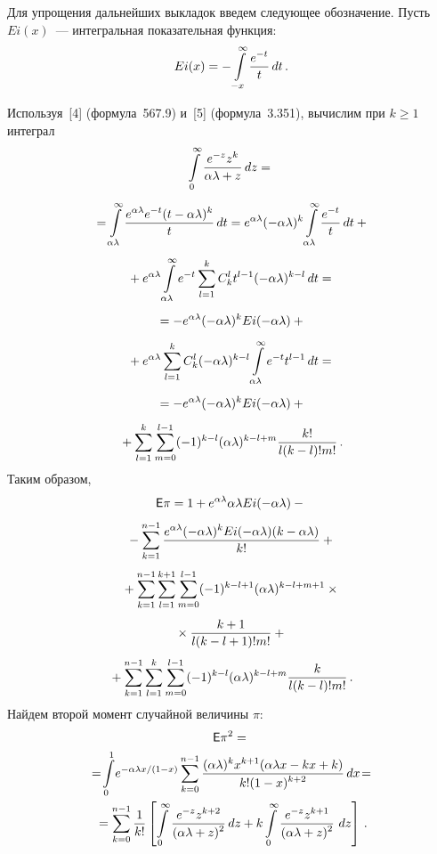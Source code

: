 \begin{multicols}{2}
Для упрощения дальнейших выкладок введем следующее обозначение. Пусть $Ei(x)$~--- интегральная показательная функция:
$$
Ei(x)=-\int\limits_{-x}^{\infty}\displaystyle\frac{\displaystyle e^{-t}\mathstrut}{\displaystyle t\mathstrut}\,dt\,.
$$

Используя~[4] (формула~567.9) и~[5] (формула~3.351), вычислим при $k\ge1$ интеграл
\begin{multline*}
\int\limits_{0}^{\infty}\displaystyle\frac{\displaystyle e^{-z}z^k\mathstrut}{\displaystyle \alpha\lambda+z\mathstrut}\,dz={}\\[5pt]
{}=\int\limits_{\alpha\lambda}^{\infty}\displaystyle\frac{\displaystyle e^{\alpha\lambda}e^{-t}(t-\alpha\lambda)^k\mathstrut}{\displaystyle t\mathstrut}\,dt=
e^{\alpha\lambda}(-\alpha\lambda)^k\int\limits_{\alpha\lambda}^{\infty}\displaystyle\frac{\displaystyle e^{-t}\mathstrut}{\displaystyle t\mathstrut}\,dt+{}\\[5pt]
{}+e^{\alpha\lambda}\int\limits_{\alpha\lambda}^{\infty}e^{-t}\sum_{l=1}^k C_k^l t^{l-1}(-\alpha\lambda)^{k-l}\, dt={}\\[5pt]
{}=-e^{\alpha\lambda}(-\alpha\lambda)^k Ei(-\alpha\lambda)+{}\\[5pt]
{}+e^{\alpha\lambda}\sum_{l=1}^k
C_k^l(-\alpha\lambda)^{k-l}\int\limits_{\alpha\lambda}^{\infty}e^{-t}t^{l-1}\,dt={}\\[5pt]
{}=-e^{\alpha\lambda}(-\alpha\lambda)^k
Ei(-\alpha\lambda)+{}\\[5pt]
{}+\sum_{l=1}^k\sum_{m=0}^{l-1}(-1)^{k-l}(\alpha\lambda)^{k-l+m}\displaystyle\frac{\displaystyle k!\mathstrut}{\displaystyle l(k-l)!m!\mathstrut}\,.
\end{multline*}
%
Таким образом,
{\begin{multline*}
{\sf E}\pi=  1+e^{\alpha\lambda}\alpha\lambda Ei(-\alpha\lambda)-{}\\[4pt]
{}-\sum_{k=1}^{n-1}\displaystyle\frac{\displaystyle e^{\alpha\lambda} (-\alpha\lambda)^{k}
Ei(-\alpha\lambda)(k-\alpha\lambda)\mathstrut}{\displaystyle k!\mathstrut}+{}\\[4pt]
{}+\sum_{k=1}^{n-1}\sum_{l=1}^{k+1}\sum_{m=0}^{l-1}(-1)^{k-l+1}(\alpha\lambda)^{k-l+m+1}\times{}\\[4pt]
{}\times \displaystyle\frac{\displaystyle k+1\mathstrut}{\displaystyle l(k-l+1)!m!\mathstrut}+{}\\[4pt]
{}+
\sum_{k=1}^{n-1}\sum_{l=1}^k\sum_{m=0}^{l-1}(-1)^{k-l}(\alpha\lambda)^{k-l+m}\displaystyle\frac{\displaystyle k\mathstrut}{\displaystyle l(k-l)!m!\mathstrut}\,.
\end{multline*}
}
%
Найдем второй момент случайной величины $\pi$:
\begin{multline*}
\e\pi^2={}\\
{}=\!\il{0}{1}\!e^{-\alpha\lambda x /(1-x)}\sum_{k=0}^{n-1}\fr{(\alpha\lambda)^k x^{k+1}(\alpha\lambda
x-kx+k)}{k!(1-x)^{k+2}}\,dx\!={}\\%
{}=\sum_{k=0}^{n-1}\fr{1}{k!}\left[\il{0}{\infty}\fr{e^{-z}z^{k+2}}{(\alpha\lambda+z)^2}\,dz
+k\il{0}{\infty}\fr{e^{-z}z^{k+1}}{(\alpha\lambda+z)^2}\ dz\right]\,.

\end{multline*}
\end{multicols}

